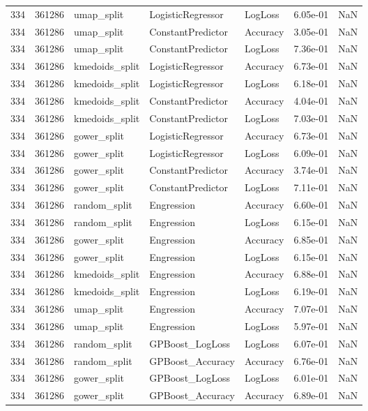 \begin{tabular}{rrlllrr}
334 & 361286 & umap\_split & LogisticRegressor & LogLoss & 6.05e-01 & NaN \\
334 & 361286 & umap\_split & ConstantPredictor & Accuracy & 3.05e-01 & NaN \\
334 & 361286 & umap\_split & ConstantPredictor & LogLoss & 7.36e-01 & NaN \\
334 & 361286 & kmedoids\_split & LogisticRegressor & Accuracy & 6.73e-01 & NaN \\
334 & 361286 & kmedoids\_split & LogisticRegressor & LogLoss & 6.18e-01 & NaN \\
334 & 361286 & kmedoids\_split & ConstantPredictor & Accuracy & 4.04e-01 & NaN \\
334 & 361286 & kmedoids\_split & ConstantPredictor & LogLoss & 7.03e-01 & NaN \\
334 & 361286 & gower\_split & LogisticRegressor & Accuracy & 6.73e-01 & NaN \\
334 & 361286 & gower\_split & LogisticRegressor & LogLoss & 6.09e-01 & NaN \\
334 & 361286 & gower\_split & ConstantPredictor & Accuracy & 3.74e-01 & NaN \\
334 & 361286 & gower\_split & ConstantPredictor & LogLoss & 7.11e-01 & NaN \\
334 & 361286 & random\_split & Engression & Accuracy & 6.60e-01 & NaN \\
334 & 361286 & random\_split & Engression & LogLoss & 6.15e-01 & NaN \\
334 & 361286 & gower\_split & Engression & Accuracy & 6.85e-01 & NaN \\
334 & 361286 & gower\_split & Engression & LogLoss & 6.15e-01 & NaN \\
334 & 361286 & kmedoids\_split & Engression & Accuracy & 6.88e-01 & NaN \\
334 & 361286 & kmedoids\_split & Engression & LogLoss & 6.19e-01 & NaN \\
334 & 361286 & umap\_split & Engression & Accuracy & 7.07e-01 & NaN \\
334 & 361286 & umap\_split & Engression & LogLoss & 5.97e-01 & NaN \\
334 & 361286 & random\_split & GPBoost\_LogLoss & LogLoss & 6.07e-01 & NaN \\
334 & 361286 & random\_split & GPBoost\_Accuracy & Accuracy & 6.76e-01 & NaN \\
334 & 361286 & gower\_split & GPBoost\_LogLoss & LogLoss & 6.01e-01 & NaN \\
334 & 361286 & gower\_split & GPBoost\_Accuracy & Accuracy & 6.89e-01 & NaN \\

\end{tabular}
